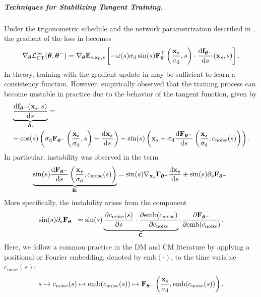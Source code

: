 \subparagraph{Techniques for Stabilizing Tangent Training.}
Under the trigonometric schedule and the network parametrization described in , the gradient of the loss in  becomes
\begin{align}\label{eq:conti-ct-loss-trig}
    \nabla_{\bm{\theta}}\mathcal{L}^\infty_{\text{CT}}(\bm{\theta},\bm{\theta}^-)  =\nabla_{\bm{\theta}} \mathbb{E}_{s, {\mathbf{x}}_0, \bm{\epsilon}} \left[ -\omega(s) \sigma_{\mathrm{d}} \sin(s) {\mathbf{F}}_{\bm{\theta}}^\top\left( \frac{{\mathbf{x}}_s}{\sigma_{\mathrm{d}}}, s \right) \cdot \frac{\mathop{}\!\mathrm{d} {\mathbf{f}}_{\bm{\theta}^-}}{\mathop{}\!\mathrm{d} s} ({\mathbf{x}}_s, s) \right].
\end{align}
 In theory, training with the gradient update in  may be sufficient to learn a consistency function. However, \citet{lu2024simplifying} empirically observed that the training process can become unstable in practice due to the behavior of the tangent function, given by
\begin{align*}
&\underbrace{\frac{\mathop{}\!\mathrm{d} {\mathbf{f}}_{\bm{\theta}^-}({\mathbf{x}}_s, s)}{\mathop{}\!\mathrm{d} s}}_{\text{{\sffamily\textbf{A.}}}}
= \\&-\cos(s) \left( \sigma_{\mathrm{d}} {\mathbf{F}}_{\bm{\theta}^-}\left( \frac{{\mathbf{x}}_s}{\sigma_{\mathrm{d}}}, s \right) - \frac{\mathop{}\!\mathrm{d} {\mathbf{x}}_s}{\mathop{}\!\mathrm{d} s} \right) - \sin(s) \left( {\mathbf{x}}_s + \sigma_{\mathrm{d}} \frac{\mathop{}\!\mathrm{d} {\mathbf{F}}_{\bm{\theta}^-}}{\mathop{}\!\mathrm{d} s}\left( \frac{{\mathbf{x}}_s}{\sigma_{\mathrm{d}}}, c_{\mathrm{noise}}(s) \right) \right).
\end{align*}
In particular, instability was observed in the term
\begin{align*}
\underbrace{\sin(s) \frac{\mathop{}\!\mathrm{d} {\mathbf{F}}_{\bm{\theta}^-}}{\mathop{}\!\mathrm{d} s}\left( \frac{{\mathbf{x}}_s}{\sigma_{\mathrm{d}}}, c_{\mathrm{noise}}(s) \right)}_{\text{{\sffamily\textbf{B.}}}}
= \sin(s) \nabla_{{\mathbf{x}}_s} {\mathbf{F}}_{\bm{\theta}^-} \frac{\mathop{}\!\mathrm{d} {\mathbf{x}}_s}{\mathop{}\!\mathrm{d} s}
+ \sin(s) \partial_s {\mathbf{F}}_{\bm{\theta}^-}.
\end{align*}
More specifically, the instability arises from the component
\begin{align}\label{eq:ds-decomposition}
        \sin(s) \partial_s {\mathbf{F}}_{\bm{\theta}^-} = \sin(s) \underbrace{\frac{\partial c_{\mathrm{noise}}(s)}{\partial s} \cdot \frac{\partial \text{emb}(c_{\mathrm{noise}})}{\partial c_{\mathrm{noise}}}}_{\text{{\sffamily\textbf{C.}}}} \cdot \frac{\partial {\mathbf{F}}_{\bm{\theta}^-}}{\partial \text{emb}(c_{\mathrm{noise}})}.
\end{align}
Here, we follow a common practice in the DM and CM literature by applying a positional or Fourier embedding, denoted by $\text{emb}(\cdot)$, to the time variable $c_{\mathrm{noise}}(s)$:
\[
s \mapsto c_{\mathrm{noise}}(s) \mapsto \text{emb}(c_{\mathrm{noise}}(s)) \mapsto {\mathbf{F}}_{\bm{\theta}^-}\left( \frac{{\mathbf{x}}_s}{\sigma_{\mathrm{d}}}, \text{emb}(c_{\mathrm{noise}}(s)) \right).
\]


